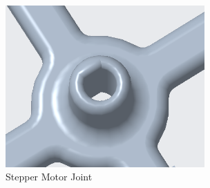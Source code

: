 \documentclass[fontsize=11pt, %
                             paper=letter, %
                             openany, %
                             captions=tableheading,
                             index=totoc,
                             hyperref]{labbook}
\begin{document}
\begin{addmargin}[0cm]{0cm}
\begin{figure}[h!]
    \center
    \includegraphics[width=3in]{figs/img/stepperMotorPressFitJoint.png}
    \caption{Stepper Motor Joint}
    \label{fig:stepperMotorPressFitJoint}
\end{figure}

\end{addmargin}
\end{document}
